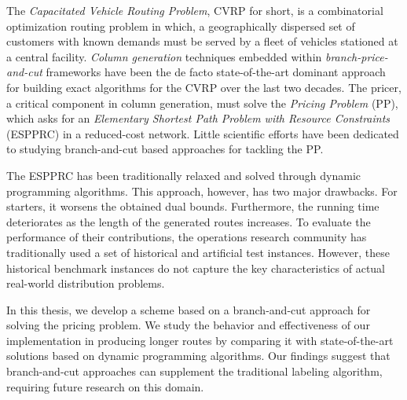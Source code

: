 
\noindent The \textit{Capacitated Vehicle Routing Problem}, CVRP for short,
is a combinatorial optimization routing problem in which,
a geographically dispersed set of customers with known demands
must be served by a fleet of vehicles stationed at a central facility.
\textit{Column generation} techniques embedded within \textit{branch-price-and-cut} frameworks
have been the de facto state-of-the-art dominant approach
for building exact algorithms for the CVRP over the last two decades.
The pricer, a critical component in column generation, must solve
the \textit{Pricing Problem} (PP), which asks for an
\textit{Elementary Shortest Path Problem with Resource Constraints} (ESPPRC)
in a reduced-cost network.
Little scientific efforts have been dedicated to studying
branch-and-cut based approaches for tackling the PP.

The ESPPRC has been traditionally relaxed and solved through dynamic programming algorithms.
This approach, however, has two major drawbacks.
For starters, it worsens the obtained dual bounds.
Furthermore, the running time deteriorates as the length of the generated routes increases.
To evaluate the performance of their contributions, the operations research community has traditionally used a set of historical and artificial test instances. However, these historical benchmark instances do not capture the key characteristics of actual real-world distribution problems.

\noindent In this thesis, we develop
a scheme based on a branch-and-cut approach for solving the pricing problem.
We study the behavior and effectiveness of our implementation in producing longer routes by comparing it with state-of-the-art solutions based on dynamic programming algorithms.
Our findings suggest that branch-and-cut approaches can supplement the traditional labeling algorithm,
requiring future research on this domain.
